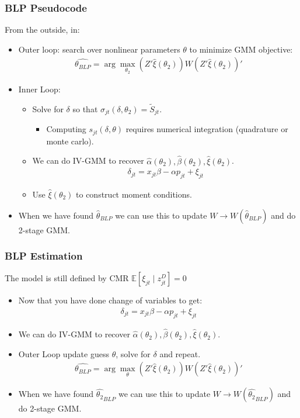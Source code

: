  \begin{frame}
\frametitle{BLP Pseudocode}
\footnotesize
From the outside, in:
\begin{itemize}
\item Outer loop: search over nonlinear parameters $\theta$ to minimize GMM objective:
 \begin{eqnarray*}
 \widehat{\theta_{BLP}} = \arg \max_{\theta_2} (Z' \hat{\xi}(\theta_2)) W  (Z' \hat{\xi}(\theta_2))'
 \end{eqnarray*}
 \item Inner Loop:
 \begin{itemize}
\item Solve for $\delta$ so that $\sigma_{jt}(\delta,\theta_2) = \tilde{S}_{jt}$.
\begin{itemize}
\item Computing $s_{jt}(\delta,\theta)$ requires numerical integration (quadrature or monte carlo).
\end{itemize}
 \item We can do IV-GMM to recover $\hat{\alpha}(\theta_2),\hat{\beta}(\theta_2),\hat{\xi}(\theta_2)$.
  \begin{eqnarray*}
\delta_{jt}= x_{jt} \beta -\alpha p_{jt}+  \xi_{jt}
 \end{eqnarray*}
  \item Use $\hat{\xi}(\theta_2)$ to construct moment conditions.
 \end{itemize}
 \item When we have found $\hat{\theta}_{BLP}$ we can use this to update $W \rightarrow W(\hat{\theta}_{BLP})$ and do 2-stage GMM.
 \end{itemize}
\end{frame}




 \begin{frame}
\frametitle{BLP Estimation}
The model is still defined by CMR $\mathbb{E}[\xi_{jt} \mid  z_{jt}^D]=0$
\begin{itemize}
 \item Now that you have done change of variables to get:
 \begin{eqnarray*}
\delta_{jt}= x_{jt} \beta -\alpha p_{jt}+  \xi_{jt}
 \end{eqnarray*}
 \item We can do IV-GMM to recover $\hat{\alpha}(\theta_2),\widehat{\beta}(\theta_2),\widehat{\xi}(\theta_2)$.
 \item Outer Loop update guess $\theta$, solve for $\delta$ and repeat.
 \begin{eqnarray*}
 \widehat{\theta_{BLP}} = \arg \max_{\theta} (Z' \widehat{\xi}(\theta_2)) W  (Z' \widehat{\xi}(\theta_2))'
 \end{eqnarray*}
 \item When we have found $\widehat{\theta_2}_{BLP}$ we can use this to update $W \rightarrow W(\widehat{\theta_2}_{BLP})$ and do 2-stage GMM.
 \end{itemize}
\end{frame}



